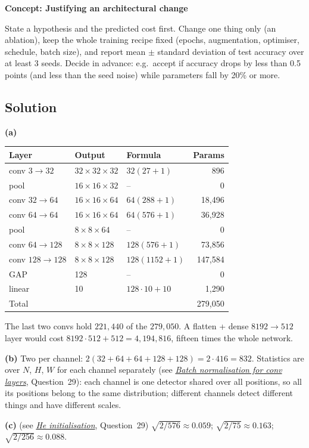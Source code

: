 \documentclass[12pt,a4paper]{article}
\newcommand{\concept}[2]{\par\medskip\phantomsection\label{#1}{\large\bfseries\color{blue!50!black} Concept: #2}\par}
\newcommand{\seeconcept}[3]{(see \hyperref[#1]{\textit{#2}}, Question~#3)}
\begin{document}
\concept{c:ablation}{Justifying an architectural change}
State a hypothesis and the predicted cost first. Change one thing only (an ablation), keep the whole training recipe fixed (epochs, augmentation, optimiser, schedule, batch size), and report mean $\pm$ standard deviation of test accuracy over at least 3 seeds. Decide in advance: e.g.\ accept if accuracy drops by less than 0.5 points (and less than the seed noise) while parameters fall by 20\% or more.

\subsection*{Solution}
\textbf{(a)}
\begin{center}
\begin{tabular}{@{}lllr@{}}
\toprule
Layer & Output & Formula & Params\\
\midrule
conv $3\to32$ & $32\times32\times32$ & $32(27+1)$ & 896\\
pool & $16\times16\times32$ & -- & 0\\
conv $32\to64$ & $16\times16\times64$ & $64(288+1)$ & 18{,}496\\
conv $64\to64$ & $16\times16\times64$ & $64(576+1)$ & 36{,}928\\
pool & $8\times8\times64$ & -- & 0\\
conv $64\to128$ & $8\times8\times128$ & $128(576+1)$ & 73{,}856\\
conv $128\to128$ & $8\times8\times128$ & $128(1152+1)$ & 147{,}584\\
GAP & 128 & -- & 0\\
linear & 10 & $128\cdot10+10$ & 1{,}290\\
\midrule
Total & & & 279{,}050\\
\bottomrule
\end{tabular}
\end{center}
The last two convs hold $221{,}440$ of the $279{,}050$. A flatten + dense $8192\to512$ layer would cost $8192\cdot512+512=4{,}194{,}816$, fifteen times the whole network.

\textbf{(b)} Two per channel: $2(32+64+64+128+128)=2\cdot416=832$. Statistics are over $N$, $H$, $W$ for each channel separately \seeconcept{c:bnconv}{Batch normalisation for conv layers}{29}: each channel is one detector shared over all positions, so all its positions belong to the same distribution; different channels detect different things and have different scales.

\textbf{(c)} \seeconcept{c:heinit}{He initialisation}{29} $\sqrt{2/576}\approx0.059$; $\sqrt{2/75}\approx0.163$; $\sqrt{2/256}\approx0.088$.
\end{document}
